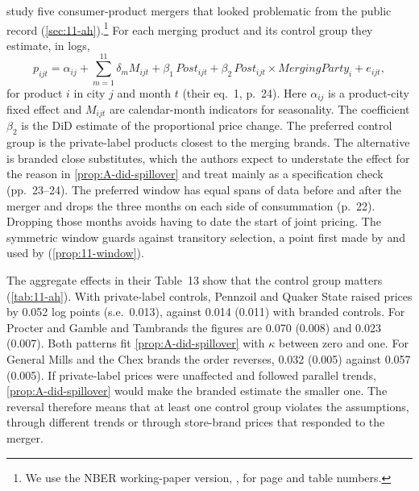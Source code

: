 \citet{AshenfelterHosken2010} study five consumer-product mergers that looked problematic from the public record
(\cref{sec:11-ah}).\footnote{We use the NBER working-paper version, \citet{AshenfelterHosken2008}, for page and table
numbers.} For each merging product and its control group they estimate, in logs,
\begin{equation}\label{eq:A-ah}
p_{ijt}=\alpha_{ij}+\sum_{m=1}^{11}\delta_m M_{ijt}+\beta_1\,\mathit{Post}_{ijt}
+\beta_2\,\mathit{Post}_{ijt}\times\mathit{MergingParty}_i+e_{ijt},
\end{equation}
for product $i$ in city $j$ and month $t$ (their eq.~1, p.~24). Here $\alpha_{ij}$ is a product-city fixed effect and
$M_{ijt}$ are calendar-month indicators for seasonality. The coefficient $\beta_2$ is the DiD estimate of the
proportional price change. The preferred control group is the private-label products closest to the merging brands.
The alternative is branded close substitutes, which the authors expect to understate the effect for the reason in
\cref{prop:A-did-spillover} and treat mainly as a specification check (pp.~23--24). The preferred window has equal
spans of data before and after the merger and drops the three months on each side of consummation (p.~22). Dropping
those months avoids having to date the start of joint pricing. The symmetric window guards against transitory
selection, a point first made by \citet{HeckmanRobb1985} and used by \citet{AshenfelterCard1985}
(\cref{prop:11-window}).

The aggregate effects in their Table~13 show that the control group matters (\cref{tab:11-ah}). With private-label
controls, Pennzoil and Quaker State raised prices by 0.052 log points (s.e.\ 0.013), against 0.014 (0.011) with
branded controls. For Procter and Gamble and Tambrands the figures are 0.070 (0.008) and 0.023 (0.007). Both
patterns fit \cref{prop:A-did-spillover} with $\kappa$ between zero and one. For General Mills and the Chex brands
the order reverses, 0.032 (0.005) against 0.057 (0.005). If private-label prices were unaffected and followed
parallel trends, \cref{prop:A-did-spillover} would make the branded estimate the smaller one. The reversal therefore
means that at least one control group violates the assumptions, through different trends or through store-brand
prices that responded to the merger.

